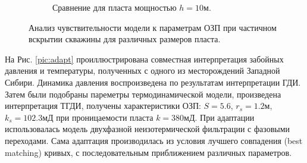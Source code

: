 \begin{figure}[H]
\begin{subfigure}[b]{0.5\textwidth}
		\caption{Сравнение для пласта мощностью $h=10\text{м}$.}
		\label{pic:h10}
	\end{subfigure}
	\caption{Анализ чувствительности модели к параметрам ОЗП при частичном вскрытии скважины для различных размеров пласта.}
	\label{pic:h}
\end{figure}

	На Рис. \ref{pic:adapt} проиллюстрирована совместная интерпретация забойных давления и температуры, полученных с одного из месторождений Западной Сибири.
	Динамика давления воспроизведена по результатам интерпретации ГДИ.
	Затем были подобраны пареметры термодинамической модели, произведена интерпретация ТГДИ, получены характеристики ОЗП: $S = 5.6$, $r_s = 1.2 \text{м}$, $k_s = 102.3 \text{мД}$ при проницаемости пласта $k = 380 \text{мД}$.
	При адаптации использовалась модель двухфазной неизотермической фильтрации с фазовыми переходами.
	Сама адаптация производилась из условия лучшего совпадения (best matching) кривых, с последовательным приближением различных параметров.

